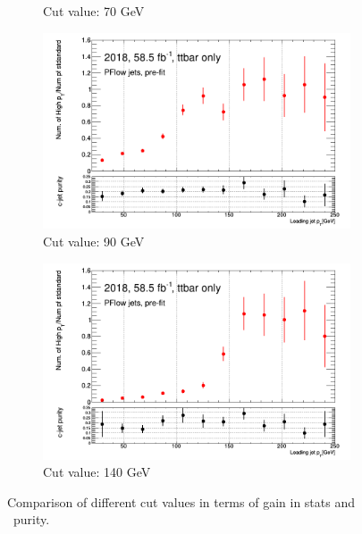 \documentclass[letterpaper,12pt]{article}
\begin{document}
\begin{figure}[!h]
\begin{subfigure}[t]{.38\linewidth}
\caption{Cut value: 70 GeV}
\end{subfigure}
\begin{subfigure}[t]{.38\linewidth}
\includegraphics[width=1\textwidth]{FTAG_plots/stat_gains/statsgain_90GeV.png}
\caption{Cut value: 90 GeV}
\end{subfigure}
\begin{subfigure}[t]{.38\linewidth}
\centering
\includegraphics[width=1\textwidth]{FTAG_plots/stat_gains/statsgain_140GeV.png}
\caption{Cut value: 140 GeV}
\end{subfigure}

\caption{Comparison of different cut values in terms of gain in stats and \cjet\ purity.}
\label{fig:cutvalue}
\end{figure}
\end{document}
